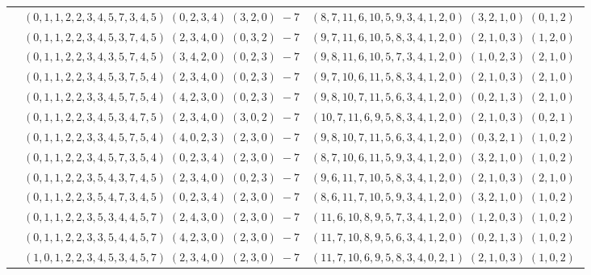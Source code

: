 \documentclass[11pt]{article}
\begin{document}
\begin{longtable}[l]{|c|c|c|}
 \cline{2-3} 
 & $(0 ,1 ,1 ,2 ,2 ,3 ,4 ,5 ,7 ,3 ,4 ,5) \;(0 ,2 ,3 ,4) \;(3 ,2 ,0) \;-7$ & $(8 ,7 ,11 ,6 ,10 ,5 ,9 ,3 ,4 ,1 ,2 ,0) \;(3 ,2 ,1 ,0) \;(0 ,1 ,2) \;$\\ 
 \cline{2-3} 
 & $(0 ,1 ,1 ,2 ,2 ,3 ,4 ,5 ,3 ,7 ,4 ,5) \;(2 ,3 ,4 ,0) \;(0 ,3 ,2) \;-7$ & $(9 ,7 ,11 ,6 ,10 ,5 ,8 ,3 ,4 ,1 ,2 ,0) \;(2 ,1 ,0 ,3) \;(1 ,2 ,0) \;$\\ 
 \cline{2-3} 
 & $(0 ,1 ,1 ,2 ,2 ,3 ,4 ,3 ,5 ,7 ,4 ,5) \;(3 ,4 ,2 ,0) \;(0 ,2 ,3) \;-7$ & $(9 ,8 ,11 ,6 ,10 ,5 ,7 ,3 ,4 ,1 ,2 ,0) \;(1 ,0 ,2 ,3) \;(2 ,1 ,0) \;$\\ 
 \cline{2-3} 
 & $(0 ,1 ,1 ,2 ,2 ,3 ,4 ,5 ,3 ,7 ,5 ,4) \;(2 ,3 ,4 ,0) \;(0 ,2 ,3) \;-7$ & $(9 ,7 ,10 ,6 ,11 ,5 ,8 ,3 ,4 ,1 ,2 ,0) \;(2 ,1 ,0 ,3) \;(2 ,1 ,0) \;$\\ 
 \cline{2-3} 
 & $(0 ,1 ,1 ,2 ,2 ,3 ,3 ,4 ,5 ,7 ,5 ,4) \;(4 ,2 ,3 ,0) \;(0 ,2 ,3) \;-7$ & $(9 ,8 ,10 ,7 ,11 ,5 ,6 ,3 ,4 ,1 ,2 ,0) \;(0 ,2 ,1 ,3) \;(2 ,1 ,0) \;$\\ 
 \cline{2-3} 
 & $(0 ,1 ,1 ,2 ,2 ,3 ,4 ,5 ,3 ,4 ,7 ,5) \;(2 ,3 ,4 ,0) \;(3 ,0 ,2) \;-7$ & $(10 ,7 ,11 ,6 ,9 ,5 ,8 ,3 ,4 ,1 ,2 ,0) \;(2 ,1 ,0 ,3) \;(0 ,2 ,1) \;$\\ 
 \cline{2-3} 
 & $(0 ,1 ,1 ,2 ,2 ,3 ,3 ,4 ,5 ,7 ,5 ,4) \;(4 ,0 ,2 ,3) \;(2 ,3 ,0) \;-7$ & $(9 ,8 ,10 ,7 ,11 ,5 ,6 ,3 ,4 ,1 ,2 ,0) \;(0 ,3 ,2 ,1) \;(1 ,0 ,2) \;$\\ 
 \cline{2-3} 
 & $(0 ,1 ,1 ,2 ,2 ,3 ,4 ,5 ,7 ,3 ,5 ,4) \;(0 ,2 ,3 ,4) \;(2 ,3 ,0) \;-7$ & $(8 ,7 ,10 ,6 ,11 ,5 ,9 ,3 ,4 ,1 ,2 ,0) \;(3 ,2 ,1 ,0) \;(1 ,0 ,2) \;$\\ 
 \cline{2-3} 
 & $(0 ,1 ,1 ,2 ,2 ,3 ,5 ,4 ,3 ,7 ,4 ,5) \;(2 ,3 ,4 ,0) \;(0 ,2 ,3) \;-7$ & $(9 ,6 ,11 ,7 ,10 ,5 ,8 ,3 ,4 ,1 ,2 ,0) \;(2 ,1 ,0 ,3) \;(2 ,1 ,0) \;$\\ 
 \cline{2-3} 
 & $(0 ,1 ,1 ,2 ,2 ,3 ,5 ,4 ,7 ,3 ,4 ,5) \;(0 ,2 ,3 ,4) \;(2 ,3 ,0) \;-7$ & $(8 ,6 ,11 ,7 ,10 ,5 ,9 ,3 ,4 ,1 ,2 ,0) \;(3 ,2 ,1 ,0) \;(1 ,0 ,2) \;$\\ 
 \cline{2-3} 
 & $(0 ,1 ,1 ,2 ,2 ,3 ,5 ,3 ,4 ,4 ,5 ,7) \;(2 ,4 ,3 ,0) \;(2 ,3 ,0) \;-7$ & $(11 ,6 ,10 ,8 ,9 ,5 ,7 ,3 ,4 ,1 ,2 ,0) \;(1 ,2 ,0 ,3) \;(1 ,0 ,2) \;$\\ 
 \cline{2-3} 
 & $(0 ,1 ,1 ,2 ,2 ,3 ,3 ,5 ,4 ,4 ,5 ,7) \;(4 ,2 ,3 ,0) \;(2 ,3 ,0) \;-7$ & $(11 ,7 ,10 ,8 ,9 ,5 ,6 ,3 ,4 ,1 ,2 ,0) \;(0 ,2 ,1 ,3) \;(1 ,0 ,2) \;$\\ 
 \cline{2-3} 
 & $(1 ,0 ,1 ,2 ,2 ,3 ,4 ,5 ,3 ,4 ,5 ,7) \;(2 ,3 ,4 ,0) \;(2 ,3 ,0) \;-7$ & $(11 ,7 ,10 ,6 ,9 ,5 ,8 ,3 ,4 ,0 ,2 ,1) \;(2 ,1 ,0 ,3) \;(1 ,0 ,2) \;$\\ 

\end{longtable}
\end{document}
